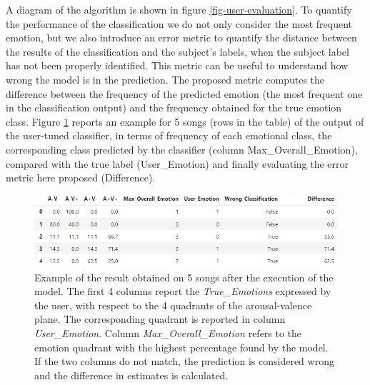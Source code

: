 \documentclass[runningheads]{llncs}
\begin{document}
A diagram of the algorithm is shown in figure \ref{fig-user-evaluation}. To quantify the performance of the classification we do not only consider the most frequent emotion, but we also introduce an error metric to quantify the distance between the results of the classification and the subject's labels, when the subject label has not been properly identified.  
This metric can be useful to understand how wrong the model is in the prediction. 
The proposed metric computes the difference between the frequency of the predicted emotion (the most frequent one in the classification output) and the frequency obtained for the true emotion class. 
Figure \ref{fig-output} reports an example for 5 songs (rows in the table) of the output of the user-tuned classifier, in terms of frequency of each emotional class, the corresponding class predicted by the classifier (column Max\_Overall\_Emotion), compared with the true label (User\_Emotion) and finally evaluating the error metric here proposed (Difference). 

\begin{figure}
\centering
\includegraphics[scale = 0.62]{img/example-output.PNG}
\caption{Example of the result obtained on 5 songs after the execution of the model. The first 4 columns report the \textit{True\_Emotions} expressed by the user, with respect to the 4 quadrants of the arousal-valence plane. The corresponding quadrant is reported in column \textit{User\_Emotion}.  Column \textit{Max\_Overall\_Emotion} refers to the emotion quadrant with the highest percentage found by the model. If the two columns do not match, the prediction is considered wrong and the difference in estimates is calculated.}
\label{fig-output}
\end{figure}



\end{document}
